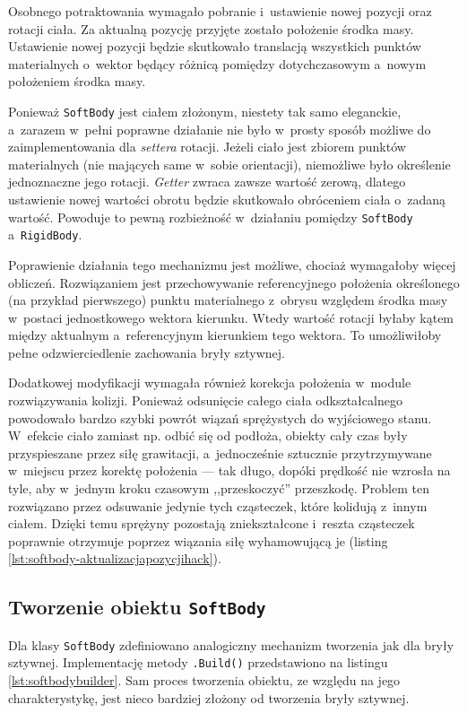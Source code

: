 Osobnego potraktowania wymagało pobranie i~ustawienie nowej pozycji oraz rotacji ciała. Za aktualną pozycję przyjęte zostało położenie środka masy. Ustawienie nowej pozycji będzie skutkowało translacją wszystkich punktów materialnych o~wektor będący różnicą pomiędzy dotychczasowym a~nowym położeniem środka masy. 

Ponieważ \verb|SoftBody| jest ciałem złożonym, niestety tak samo eleganckie, a~zarazem w~pełni poprawne działanie nie było w~prosty sposób możliwe do zaimplementowania dla \textit{settera} rotacji. Jeżeli ciało jest zbiorem punktów materialnych (nie mających same w~sobie orientacji), niemożliwe było określenie jednoznaczne jego rotacji. \textit{Getter} zwraca zawsze wartość zerową, dlatego ustawienie nowej wartości obrotu będzie skutkowało obróceniem ciała o~zadaną wartość. Powoduje to pewną rozbieżność w~działaniu pomiędzy \verb|SoftBody| a~\verb|RigidBody|.

Poprawienie działania tego mechanizmu jest możliwe, chociaż wymagałoby więcej obliczeń. Rozwiązaniem jest przechowywanie referencyjnego położenia określonego (na przykład pierwszego) punktu materialnego z~obrysu względem środka masy w~postaci jednostkowego wektora kierunku. Wtedy wartość rotacji byłaby kątem między aktualnym a~referencyjnym kierunkiem tego wektora. To umożliwiłoby pełne odzwierciedlenie zachowania bryły sztywnej.

Dodatkowej modyfikacji wymagała również korekcja położenia w~module rozwiązywania kolizji. Ponieważ odsunięcie całego ciała odkształcalnego powodowało bardzo szybki powrót wiązań sprężystych do wyjściowego stanu. W~efekcie ciało zamiast np. odbić się od podłoża, obiekty cały czas były przyspieszane przez siłę grawitacji, a~jednocześnie sztucznie przytrzymywane w~miejscu przez korektę położenia --- tak długo, dopóki prędkość nie wzrosła na tyle, aby w~jednym kroku czasowym ,,przeskoczyć'' przeszkodę. Problem ten rozwiązano przez odsuwanie jedynie tych cząsteczek, które kolidują z~innym ciałem. Dzięki temu sprężyny pozostają zniekształcone i~reszta cząsteczek poprawnie otrzymuje poprzez wiązania siłę wyhamowującą je (listing \ref{lst:softbody-aktualizacjapozycjihack}).



\subsection{Tworzenie obiektu \texttt{SoftBody}}
Dla klasy \verb|SoftBody| zdefiniowano analogiczny mechanizm tworzenia jak dla bryły sztywnej. Implementację metody \verb|.Build()| przedstawiono na listingu \ref{lst:softbodybuilder}. Sam proces tworzenia obiektu, ze względu na jego charakterystykę, jest nieco bardziej złożony od tworzenia bryły sztywnej. 

